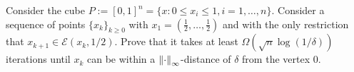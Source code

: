 \documentclass[10pt]{article}
\begin{document}
\maketitle



\begin{problem}[Problem 1]
    Consider the cube \( P:=[0,1]^n = \{x : 0\leq x_i \leq 1, i=1,\ldots, n \} \). Consider a sequence of points \( \{x_k\}_{k\geq 0} \) with \( x_1 = \left( \frac{1}{2}, \ldots, \frac{1}{2} \right) \) and with the only restriction that \( x_{k+1}\in \mathcal{E} (x_k,1/2) \). Prove that it takes at least \( \Omega (\sqrt{n} \log (1/\delta)) \) iterations until \( x_k \) can be within a \( \left\lVert\cdot\right\rVert_\infty \)-distance of \( \delta \) from the vertex \( 0 \).
\end{problem}
\end{document}
